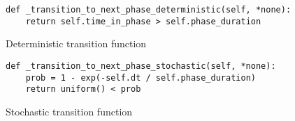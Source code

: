 \begin{listing}[!ht]
\begin{verbatim}
def _transition_to_next_phase_deterministic(self, *none):
    return self.time_in_phase > self.phase_duration
\end{verbatim}
\caption{Deterministic transition function}\label{code:phase:transition:deter}
\end{listing}


\begin{listing}[!ht]
\begin{verbatim}
def _transition_to_next_phase_stochastic(self, *none):
    prob = 1 - exp(-self.dt / self.phase_duration)
    return uniform() < prob
\end{verbatim}
\caption{Stochastic transition function}\label{code:phase:transition:stoch}
\end{listing}
